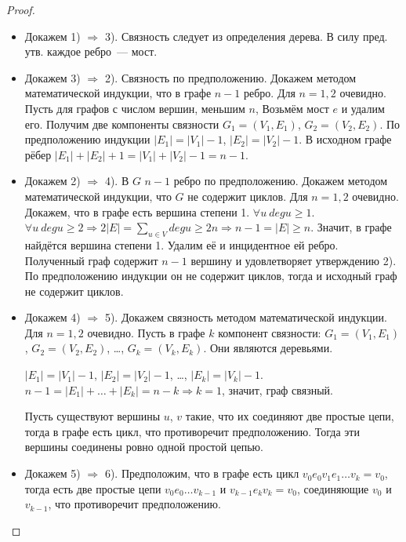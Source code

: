 \begin{proof}
\begin{itemize}
	\item Докажем 1) $\Rightarrow$ 3). Связность следует из определения дерева. В силу пред. утв. каждое ребро~--- мост.
	
	\item Докажем 3) $\Rightarrow$ 2). Связность по предположению. Докажем методом математической индукции, что в графе $n - 1$ ребро.
	\indbase Для $n = 1, 2$ очевидно.
	\indstep Пусть для графов с числом вершин, меньшим $n$,  Возьмём мост $e$ и удалим его. Получим две компоненты связности $G_1 = (V_1, E_1)$, $G_2 = (V_2, E_2)$. По предположению индукции $|E_1| = |V_1| - 1$, $|E_2| = |V_2| - 1$. В исходном графе рёбер $|E_1| + |E_2| + 1 = |V_1| + |V_2| - 1 = n - 1$.
	\indend
	
	\item Докажем 2) $\Rightarrow$ 4). В $G$ $n - 1$ ребро по предположению. Докажем методом математической индукции, что $G$ не содержит циклов.
	\indbase Для $n = 1, 2$ очевидно.
	\indstep Докажем, что в графе есть вершина степени 1. $\forall u \ deg u \geqslant 1$. $\forall u \ deg u \geqslant 2 \Rightarrow 2|E| = \sum_{u \in V} deg u \geqslant 2n \Rightarrow n - 1 = |E| \geqslant n$. Значит, в графе найдётся вершина степени 1. Удалим её и инцидентное ей ребро. Полученный граф содержит $n - 1$ вершину и удовлетворяет утверждению 2). По предположению индукции он не содержит циклов, тогда и исходный граф не содержит циклов.
	\indend
	
	\item Докажем 4) $\Rightarrow$ 5). Докажем связность методом математической индукции.
	\indbase Для $n = 1, 2$ очевидно.
	\indstep Пусть в графе $k$ компонент связности: $G_1 = (V_1, E_1)$, $G_2 = (V_2, E_2)$, \ldots, $G_k = (V_k, E_k)$. Они являются деревьями.
	\indend
	
	$|E_1| = |V_1| - 1$, $|E_2| = |V_2| - 1$, \ldots, $|E_k| = |V_k| - 1$. $n - 1 = |E_1| + \ldots + |E_k| = n - k \Rightarrow k = 1$, значит, граф связный.
	
	Пусть существуют вершины $u$, $v$ такие, что их соединяют две простые цепи, тогда в графе есть цикл, что противоречит предположению. Тогда эти вершины соединены ровно одной простой цепью.
	
	\item Докажем 5) $\Rightarrow$ 6). Предположим, что в графе есть цикл $v_0 e_0 v_1 e_1 \ldots v_k = v_0$, тогда есть две простые цепи $v_0 e_0 \ldots v_{k-1}$ и $v_{k-1} e_k v_k = v_0$, соединяющие $v_0$ и $v_{k-1}$, что противоречит предположению.
	

\end{itemize}
\end{proof}
